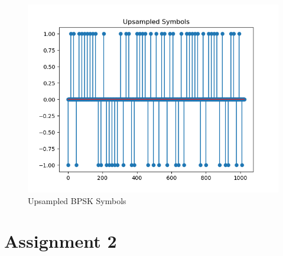\documentclass[
	letterpaper, %
	10pt, %
]{CSUniSchoolLabReport}
\begin{document}
\begin{figure}[H] %
	\centering %
	\includegraphics[width=1.2\textwidth]{assignment1.png} %
	\caption{Upsampled BPSK Symbols}
	\label{fig:block}
\end{figure}

\section{Assignment 2}
\end{document}
